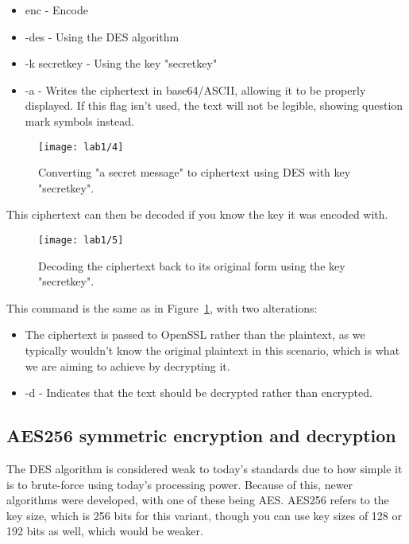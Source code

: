 \begin{itemize}
    \item enc - Encode
    \item -des - Using the DES algorithm
    \item -k secretkey - Using the key "secretkey"
    \item -a - Writes the ciphertext in base64/ASCII, allowing it to be properly displayed.
               If this flag isn't used, the text will not be legible, showing question mark symbols instead.
\end{itemize}

\begin{figure}[H]
    \centering
    \texttt{[image: lab1/4]}
    \caption{Converting "a secret message" to ciphertext using DES with key "secretkey".}
    \label{fig:DESEncrypt}
\end{figure}

This ciphertext can then be decoded if you know the key it was encoded with.

\begin{figure}[H]
    \centering
    \texttt{[image: lab1/5]}
    \caption{Decoding the ciphertext back to its original form using the key "secretkey".}
    \label{fig:DESDecrypt}
\end{figure}

This command is the same as in Figure~\ref{fig:DESEncrypt}, with two alterations:
\begin{itemize}
    \item The ciphertext is passed to OpenSSL rather than the plaintext, as we typically wouldn't know
          the original plaintext in this scenario, which is what we are aiming to achieve by decrypting it.
    \item -d - Indicates that the text should be decrypted rather than encrypted.
\end{itemize}

\pagebreak

\subsection{AES256 symmetric encryption and decryption}\label{subsec:aes256}
The DES algorithm is considered weak to today's standards due to how simple it is to
brute-force using today's processing power.
Because of this, newer algorithms were developed, with one of these being AES\@.
AES256 refers to the key size, which is 256 bits for this variant, though you can use key sizes of
128 or 192 bits as well, which would be weaker.

